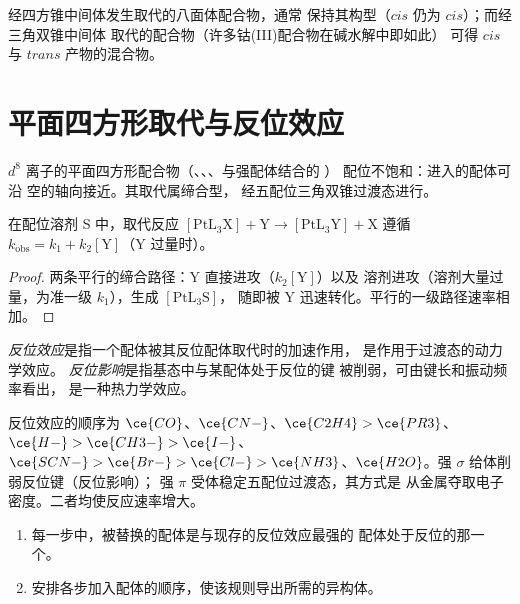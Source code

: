 经四方锥中间体发生取代的八面体配合物，通常
保持其构型（$cis$ 仍为 $cis$）；而经三角双锥中间体
取代的配合物（许多钴(III)配合物在碱水解中即如此）
可得 $cis$ 与 $trans$ 产物的混合物。

\section{平面四方形取代与反位效应}

$d^8$ 离子的平面四方形配合物（、、、与强配体结合的 ）
配位不饱和：进入的配体可沿
空的轴向接近。其取代属缔合型，
经五配位三角双锥过渡态进行。

\begin{proposition}[双项速率方程]\label{prop:b3:complex-mechanisms:square-planar}
在配位溶剂 S 中，取代反应 $\mathrm{[PtL_3X] + Y \to [PtL_3Y] + X}$ 遵循
$k_{\mathrm{obs}} = k_1 + k_2[\mathrm Y]$（Y 过量时）。
\end{proposition}

\begin{proof}
两条平行的缔合路径：Y 直接进攻（$k_2[\mathrm Y]$）以及
溶剂进攻（溶剂大量过量，为准一级 $k_1$），生成 $[\mathrm{PtL_3S}]$，
随即被 Y 迅速转化。平行的一级路径速率相加。
\end{proof}

\begin{definition}\label{def:b3:complex-mechanisms:trans-effect}
\emph{反位效应}是指一个配体被其反位配体取代时的加速作用，
是作用于过渡态的动力学效应。
\emph{反位影响}是指基态中与某配体处于反位的键
被削弱，可由键长和振动频率看出，
是一种热力学效应。
\end{definition}

反位效应的顺序为 $\ce{CO}$、$\ce{CN-}$、$\ce{C2H4} > \ce{PR3}$、$\ce{H-} > \ce{CH3-} > \ce{I-}$、$\ce{SCN-} >
\ce{Br-} > \ce{Cl-} > \ce{NH3}$、$\ce{H2O}$。强 $\sigma$ 给体削弱反位键（反位影响）；
强 $\pi$ 受体稳定五配位过渡态，其方式是
从金属夺取电子密度。二者均使反应速率增大。

\begin{method}\label{met:b3:complex-mechanisms:pt-synthesis}
\begin{enumerate}
  \item 每一步中，被替换的配体是与现存的反位效应最强的
        配体处于反位的那一个。
  \item 安排各步加入配体的顺序，使该规则导出所需的异构体。
\end{enumerate}
\end{method}

